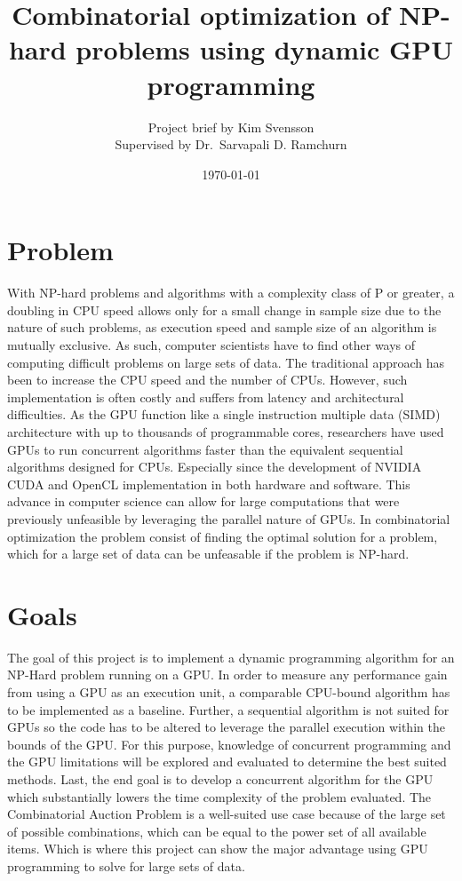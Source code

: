 \documentclass[a4paper, 12pt]{article}
\title{Combinatorial optimization of NP-hard problems using dynamic GPU programming}
\author{Project brief by Kim Svensson \\ \small{Supervised by Dr.\ Sarvapali D. Ramchurn}}
\date{\today}
\begin{document}
\maketitle
{}%
\section{Problem}
With NP-hard problems and algorithms with a complexity class of P or greater, a doubling in CPU speed allows only for a small change in sample size due to the nature of such problems, as execution speed and sample size of an algorithm is mutually exclusive.
As such, computer scientists have to find other ways of computing difficult problems on large sets of data.
The traditional approach has been to increase the CPU speed and the number of CPUs.
However, such implementation is often costly and suffers from latency and architectural difficulties.
As the GPU function like a single instruction multiple data (SIMD) architecture with up to thousands of programmable cores, researchers have used GPUs to run concurrent algorithms faster than the equivalent sequential algorithms designed for CPUs. Especially since the development of NVIDIA CUDA and OpenCL implementation in both hardware and software.
This advance in computer science can allow for large computations that were previously unfeasible by leveraging the parallel nature of GPUs. In combinatorial optimization the problem consist of finding the optimal solution for a problem, which for a large set of data can be unfeasable if the problem is NP-hard.

\section{Goals}

The goal of this project is to implement a dynamic programming algorithm for an NP-Hard problem running on a GPU.
In order to measure any performance gain from using a GPU as an execution unit, a comparable CPU-bound algorithm has to be implemented as a baseline.
Further, a sequential algorithm is not suited for GPUs so the code has to be altered to leverage the parallel execution within the bounds of the GPU.
For this purpose, knowledge of concurrent programming and the GPU limitations will be explored and evaluated to determine the best suited methods.
Last, the end goal is to develop a concurrent algorithm for the GPU which substantially lowers the time complexity of the problem evaluated. The Combinatorial Auction Problem is a well-suited use case because of the large set of possible combinations, which can be equal to the power set of all available items. Which is where this project can show the major advantage using GPU programming to solve for large sets of data.
\end{document}
